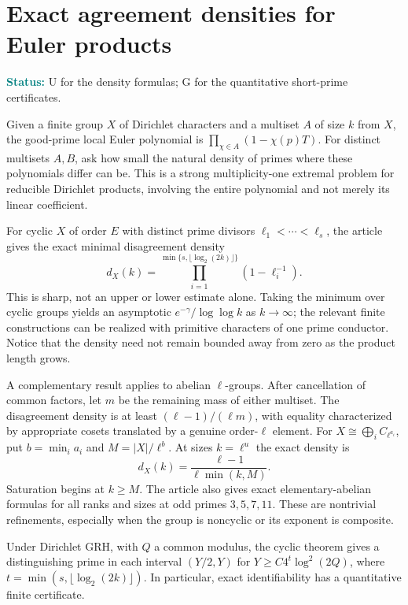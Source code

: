 \documentclass[11pt]{article}
\newcommand{\status}[1]{\par\smallskip\noindent\textcolor{teal}{\textbf{Status:}} #1\par\smallskip}
\begin{document}
\section{Exact agreement densities for Euler products}
\status{U for the density formulas; G for the quantitative short-prime certificates.}
Given a finite group $X$ of Dirichlet characters and a multiset $A$ of size $k$ from $X$, the good-prime local Euler polynomial is $\prod_{\chi\in A}(1-\chi(p)T)$. For distinct multisets $A,B$, ask how small the natural density of primes where these polynomials differ can be. This is a strong multiplicity-one extremal problem for reducible Dirichlet products, involving the entire polynomial and not merely its linear coefficient.

For cyclic $X$ of order $E$ with distinct prime divisors $\ell_1<\cdots<\ell_s$, the article gives the exact minimal disagreement density
\[
 d_X(k)=\prod_{i=1}^{\min\{s,\lfloor\log_2(2k)\rfloor\}}(1-\ell_i^{-1}).
\]
This is sharp, not an upper or lower estimate alone. Taking the minimum over cyclic groups yields an asymptotic $e^{-\gamma}/\log\log k$ as $k\to\infty$; the relevant finite constructions can be realized with primitive characters of one prime conductor. Notice that the density need not remain bounded away from zero as the product length grows.

A complementary result applies to abelian $\ell$-groups. After cancellation of common factors, let $m$ be the remaining mass of either multiset. The disagreement density is at least $(\ell-1)/(\ell m)$, with equality characterized by appropriate cosets translated by a genuine order-$\ell$ element. For $X\cong\bigoplus_i C_{\ell^{a_i}}$, put $b=\min_i a_i$ and $M=|X|/\ell^b$. At sizes $k=\ell^u$ the exact density is
\[
 d_X(k)=\frac{\ell-1}{\ell\min(k,M)}.
\]
Saturation begins at $k\ge M$. The article also gives exact elementary-abelian formulas for all ranks and sizes at odd primes $3,5,7,11$. These are nontrivial refinements, especially when the group is noncyclic or its exponent is composite.

Under Dirichlet GRH, with $Q$ a common modulus, the cyclic theorem gives a distinguishing prime in each interval $(Y/2,Y)$ for $Y\ge C4^t\log^2(2Q)$, where $t=\min(s,\lfloor\log_2(2k)\rfloor)$. In particular, exact identifiability has a quantitative finite certificate.
\end{document}
